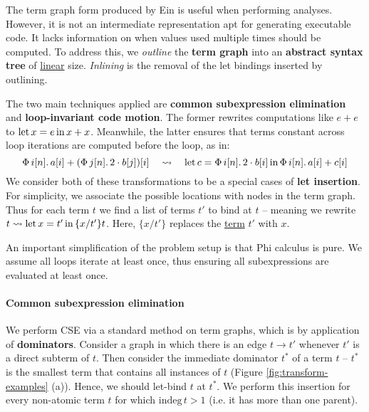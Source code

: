 The term graph form produced by Ein is useful when performing analyses.
However, it is not an intermediate representation apt for generating executable code. It lacks information on when values used multiple times should be computed. To address this, we \textit{outline} the \textbf{term graph} into an \textbf{abstract syntax tree} of \underline{linear} size.
\textit{Inlining} is the removal of the let bindings inserted by outlining. 

The two main techniques applied are \textbf{common subexpression elimination} and \textbf{loop-invariant code motion}. The former rewrites computations like $e + e$ to  $\mathrm{let}\,{x}={e}\,\mathrm{in}\,{x + x}$. Meanwhile, the latter ensures that terms constant across loop iterations are computed before the loop, as in:
$$ 
\phivec{i}{n}{a[i] + \left( \phivec{j}{n}{2 \cdot b[j]} \right)[i]} \quad\leadsto\quad \philet{c}{\phivec{i}{n}{2 \cdot b[i]}}{\phivec{i}{n}{a[i] + c[i]}} 
$$
We consider both of these transformations to be a special cases of \textbf{let insertion}. 
For simplicity, we associate the possible locations with nodes in the term graph. Thus for each term $t$ we find a list of terms $t'$ to bind at $t$ -- meaning we rewrite $t \leadsto \mathrm{let}\,{x}={t'}\,\mathrm{in}\,{\{x/t'\}t}$. Here, $\{x/t'\}$ replaces the \underline{term} $t'$ with $x$.

An important simplification of the problem setup is that Phi calculus is pure. 
We assume all loops iterate at least once, thus ensuring all subexpressions are evaluated at least once.

\paragraph{Common subexpression elimination} We perform CSE via a standard method on term graphs, which is by application of \textbf{dominators}. Consider a graph in which there is an edge $t \to t'$ whenever $t'$ is a direct subterm of $t$. Then consider the immediate dominator $t^*$ of a term $t$ -- $t^*$ is the smallest term that contains all instances of $t$ (Figure \ref{fig:transform-examples} (a)). Hence, we should let-bind $t$ at $t^*$. We perform this insertion for every non-atomic term $t$ for which $\mathrm{indeg}\,t > 1$ (i.e. it has more than one parent). 

